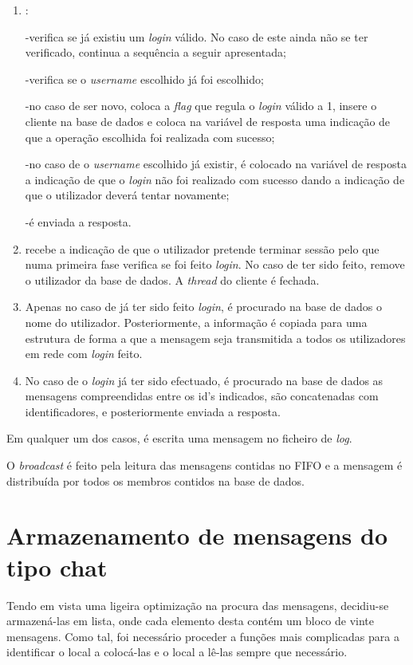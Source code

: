 \documentclass[a4paper]{article}
\begin{document}
\begin{enumerate}

  \item: 
  
 -verifica se já existiu um \textit{login} válido. No caso de este ainda não se ter verificado, continua a sequência a seguir apresentada;
 
 -verifica se o \textit{username} escolhido já foi escolhido;
 
 -no caso de ser novo, coloca a \textit{flag} que regula o \textit{login} válido a 1, insere o cliente na base de dados e coloca na variável de resposta uma indicação de que a operação escolhida foi realizada com sucesso;
 
 -no caso de o \textit{username} escolhido já existir, é colocado na variável de resposta a indicação de que o \textit{login} não foi realizado com sucesso dando a indicação de que o utilizador deverá tentar novamente;
 
-é enviada a resposta.

\item recebe a indicação de que o utilizador pretende terminar sessão pelo que numa primeira fase verifica se foi feito \textit{login}. No caso de ter sido feito, remove o utilizador da base de dados. A \textit{thread} do cliente é fechada.

  \item Apenas no caso de já ter sido feito \textit{login}, é procurado na base de dados o nome do utilizador. Posteriormente, a informação é copiada para uma estrutura de forma a que a mensagem seja transmitida a todos os utilizadores em rede com \textit{login} feito.
  
  \item No caso de o \textit{login} já ter sido efectuado, é procurado na base de dados as mensagens compreendidas entre os id's indicados, são concatenadas com identificadores,  e posteriormente enviada a resposta.
  
\end{enumerate}

Em qualquer um dos casos, é escrita uma mensagem no ficheiro de \textit{log}.

O \textit{broadcast} é feito pela leitura das mensagens contidas no FIFO e a mensagem é distribuída por todos os membros contidos na base de dados.

\section{Armazenamento de mensagens do tipo chat}
Tendo em vista uma ligeira optimização na procura das mensagens, decidiu-se armazená-las em lista, onde cada elemento desta contém um bloco de vinte mensagens. Como tal, foi necessário proceder a funções mais complicadas para a identificar o local a colocá-las e o local a lê-las sempre que necessário.
\end{document}
